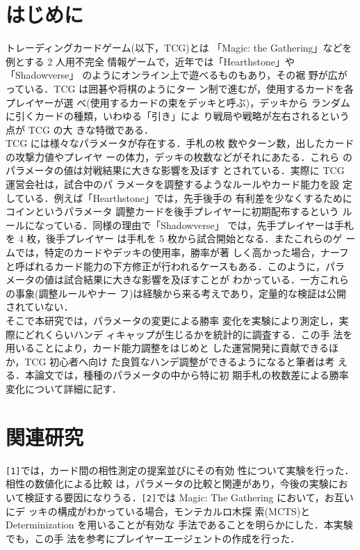 \documentclass[twocolumn]{ltjsarticle}
\begin{document}
\section{はじめに}
\small{
  トレーディングカードゲーム(以下，TCG)とは
「Magic: the Gathering」などを例とする 2 人用不完全
情報ゲームで，近年では「Hearthstone」や「Shadowverse」
のようにオンライン上で遊べるものもあり，その裾
野が広がっている．TCG は囲碁や将棋のようにター
ン制で進むが，使用するカードを各プレイヤーが選
べ(使用するカードの束をデッキと呼ぶ)，デッキから
ランダムに引くカードの種類，いわゆる「引き」によ
り戦局や戦略が左右されるという点が TCG の大
きな特徴である．
\\ TCG には様々なパラメータが存在する．手札の枚
数やターン数，出したカードの攻撃力値やプレイヤ
ーの体力，デッキの枚数などがそれにあたる．これら
のパラメータの値は対戦結果に大きな影響を及ぼす
とされている．実際に TCG 運営会社は，試合中のパ
ラメータを調整するようなルールやカード能力を設
定している．例えば「Hearthstone」では，先手後手の
有利差を少なくするためにコインというパラメータ
調整カードを後手プレイヤーに初期配布するという
ルールになっている．同様の理由で「Shadowverse」
では，先手プレイヤーは手札を 4 枚，後手プレイヤー
は手札を 5 枚から試合開始となる．またこれらのゲ
ームでは，特定のカードやデッキの使用率，勝率が著
しく高かった場合，ナーフと呼ばれるカード能力の下方修正が行われるケースもある．このように，パラ
メータの値は試合結果に大きな影響を及ぼすことが
わかっている．一方これらの事象(調整ルールやナー
フ)は経験から来る考えであり，定量的な検証は公開
されていない．
\\ そこで本研究では，パラメータの変更による勝率
変化を実験により測定し，実際にどれくらいハンデ
ィキャップが生じるかを統計的に調査する．この手
法を用いることにより，カード能力調整をはじめと
した運営開発に貢献できるほか，TCG 初心者へ向け
た良質なハンデ調整ができるようになると筆者は考
える．本論文では，種種のパラメータの中から特に初
期手札の枚数差による勝率変化について詳細に記す．
}

\section{関連研究}
\small{
  \verb#[1]#では，カード間の相性測定の提案並びにその有効
性について実験を行った．相性の数値化による比較
は，パラメータの比較と関連があり，今後の実験にお
いて検証する要因になりうる．\verb#[2]#では Magic: The Gathering において，お互いにデ
ッキの構成がわかっている場合，モンテカルロ木探
索(MCTS)と Determinization を用いることが有効な
手法であることを明らかにした．本実験でも，この手
法を参考にプレイヤーエージェントの作成を行った．
}
\end{document}
